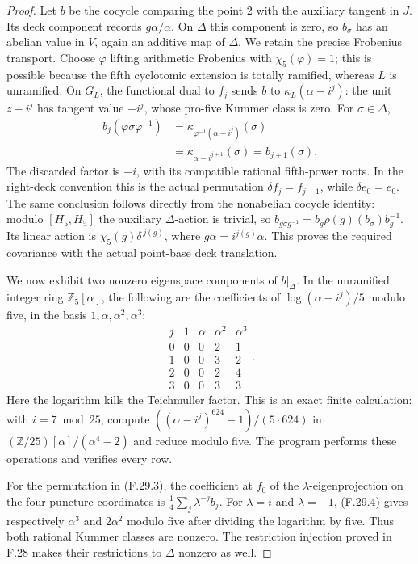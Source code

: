 \begin{proof}
Let $b$ be the cocycle comparing the
point $2$ with the auxiliary tangent
in $J$.  Its deck component records
$g\alpha/\alpha$.
On $\Delta$ this component is zero,
so $b_\sigma$ has an abelian value
in $V$, again an additive map of
$\Delta$.  We retain the precise
Frobenius transport.
Choose $\varphi$ lifting arithmetic
Frobenius with $\chi_5(\varphi)=1$;
this is possible because the fifth
cyclotomic extension is totally
ramified, whereas $L$ is unramified.
On $G_L$, the functional dual to
$f_j$ sends $b$ to
$\kappa_L(\alpha-i^j)$:
the unit $z-i^j$ has tangent value
$-i^j$, whose pro-five Kummer
class is zero.
For $\sigma\in\Delta$,
\[
 \begin{split}
 b_j(\varphi\sigma\varphi^{-1})
 &=\kappa_{\varphi^{-1}(\alpha-i^j)}(\sigma)\\
 &=\kappa_{\alpha-i^{j+1}}(\sigma)
   =b_{j+1}(\sigma).
 \end{split}                                              \tag{F.29.3}
\]
The discarded factor is $-i$, with
its compatible rational fifth-power
roots.  In the right-deck convention
this is the actual permutation
$\delta f_j=f_{j-1}$, while
$\delta e_0=e_0$.
The same conclusion follows directly
from the nonabelian cocycle identity:
modulo $[H_5,H_5]$ the auxiliary
$\Delta$-action is trivial, so
$b_{g\sigma g^{-1}}
 =b_g\rho(g)(b_\sigma)b_g^{-1}$.
Its linear action is
$\chi_5(g)\delta^{\,j(g)}$,
where $g\alpha=i^{j(g)}\alpha$.
This proves the required covariance
with the actual point-base deck
translation.

We now exhibit two nonzero eigenspace
components of $b|_\Delta$.
In the unramified integer ring
$\mathbb Z_5[\alpha]$,
the following are the coefficients
of $\log(\alpha-i^j)/5$ modulo five,
in the basis $1,\alpha,\alpha^2,\alpha^3$:
\[
 \begin{array}{c|rrrr}
 j&1&\alpha&\alpha^2&\alpha^3\\ \hline
 0&0&0&2&1\\
 1&0&0&3&2\\
 2&0&0&2&4\\
 3&0&0&3&3
 \end{array}.                                             \tag{F.29.4}
\]
Here the logarithm kills the Teichmuller
factor.  This is an exact finite
calculation: with $i=7\bmod25$,
compute
$((\alpha-i^j)^{624}-1)/(5\cdot624)$
in
$(\mathbb Z/25)[\alpha]/(\alpha^4-2)$
and reduce modulo five.
The program performs these operations
and verifies every row.

For the permutation in (F.29.3),
the coefficient at $f_0$ of the
$\lambda$-eigenprojection on the
four puncture coordinates is
$\frac14\sum_j\lambda^{-j}b_j$.
For $\lambda=i$ and $\lambda=-1$,
(F.29.4) gives respectively
$\alpha^3$ and $2\alpha^2$ modulo
five after dividing the logarithm
by five.  Thus both rational
Kummer classes are nonzero.
The restriction injection proved
in F.28 makes their restrictions
to $\Delta$ nonzero as well.


\end{proof}
